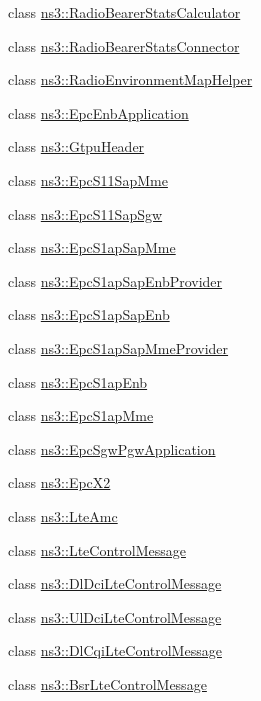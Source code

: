 \begin{DoxyCompactItemize}
class \hyperlink{classns3_1_1RadioBearerStatsCalculator}{ns3\+::\+Radio\+Bearer\+Stats\+Calculator}
\item 
class \hyperlink{classns3_1_1RadioBearerStatsConnector}{ns3\+::\+Radio\+Bearer\+Stats\+Connector}
\item 
class \hyperlink{classns3_1_1RadioEnvironmentMapHelper}{ns3\+::\+Radio\+Environment\+Map\+Helper}
\item 
class \hyperlink{classns3_1_1EpcEnbApplication}{ns3\+::\+Epc\+Enb\+Application}
\item 
class \hyperlink{classns3_1_1GtpuHeader}{ns3\+::\+Gtpu\+Header}
\item 
class \hyperlink{classns3_1_1EpcS11SapMme}{ns3\+::\+Epc\+S11\+Sap\+Mme}
\item 
class \hyperlink{classns3_1_1EpcS11SapSgw}{ns3\+::\+Epc\+S11\+Sap\+Sgw}
\item 
class \hyperlink{classns3_1_1EpcS1apSapMme}{ns3\+::\+Epc\+S1ap\+Sap\+Mme}
\item 
class \hyperlink{classns3_1_1EpcS1apSapEnbProvider}{ns3\+::\+Epc\+S1ap\+Sap\+Enb\+Provider}
\item 
class \hyperlink{classns3_1_1EpcS1apSapEnb}{ns3\+::\+Epc\+S1ap\+Sap\+Enb}
\item 
class \hyperlink{classns3_1_1EpcS1apSapMmeProvider}{ns3\+::\+Epc\+S1ap\+Sap\+Mme\+Provider}
\item 
class \hyperlink{classns3_1_1EpcS1apEnb}{ns3\+::\+Epc\+S1ap\+Enb}
\item 
class \hyperlink{classns3_1_1EpcS1apMme}{ns3\+::\+Epc\+S1ap\+Mme}
\item 
class \hyperlink{classns3_1_1EpcSgwPgwApplication}{ns3\+::\+Epc\+Sgw\+Pgw\+Application}
\item 
class \hyperlink{classns3_1_1EpcX2}{ns3\+::\+Epc\+X2}
\item 
class \hyperlink{classns3_1_1LteAmc}{ns3\+::\+Lte\+Amc}
\item 
class \hyperlink{classns3_1_1LteControlMessage}{ns3\+::\+Lte\+Control\+Message}
\item 
class \hyperlink{classns3_1_1DlDciLteControlMessage}{ns3\+::\+Dl\+Dci\+Lte\+Control\+Message}
\item 
class \hyperlink{classns3_1_1UlDciLteControlMessage}{ns3\+::\+Ul\+Dci\+Lte\+Control\+Message}
\item 
class \hyperlink{classns3_1_1DlCqiLteControlMessage}{ns3\+::\+Dl\+Cqi\+Lte\+Control\+Message}
\item 
class \hyperlink{classns3_1_1BsrLteControlMessage}{ns3\+::\+Bsr\+Lte\+Control\+Message}

\end{DoxyCompactItemize}
